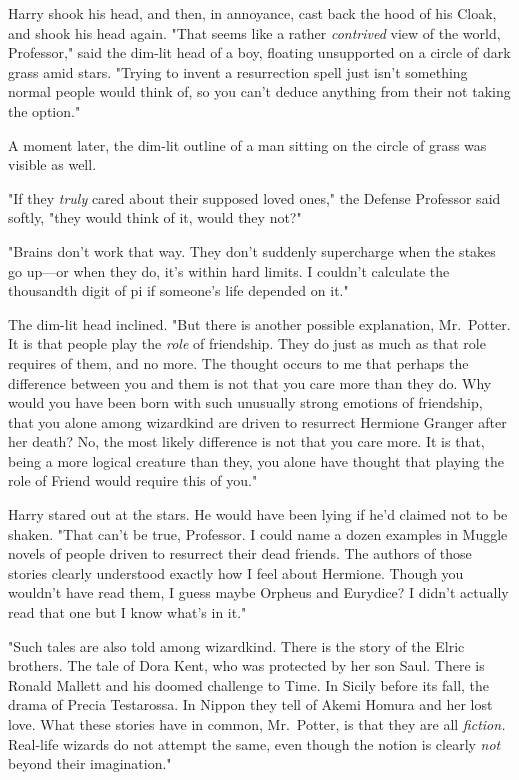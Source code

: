 Harry shook his head, and then, in annoyance, cast back the hood of his Cloak,
and shook his head again. "That seems like a rather \emph{contrived} view of
the world, Professor," said the dim-lit head of a boy, floating unsupported on
a circle of dark grass amid stars. "Trying to invent a resurrection spell just
isn't something normal people would think of, so you can't deduce anything from
their not taking the option."

A moment later, the dim-lit outline of a man sitting on the circle of grass was
visible as well.

"If they \emph{truly} cared about their supposed loved ones," the Defense
Professor said softly, "they would think of it, would they not?"

"Brains don't work that way. They don't suddenly supercharge when the stakes go
up---or when they do, it's within hard limits. I couldn't calculate the
thousandth digit of pi if someone's life depended on it."

The dim-lit head inclined. "But there is another possible explanation,
Mr.~Potter. It is that people play the \emph{role} of friendship. They do just
as much as that role requires of them, and no more. The thought occurs to me
that perhaps the difference between you and them is not that you care more than
they do. Why would you have been born with such unusually strong emotions of
friendship, that you alone among wizardkind are driven to resurrect Hermione
Granger after her death? No, the most likely difference is not that you care
more. It is that, being a more logical creature than they, you alone have
thought that playing the role of Friend would require this of you."

Harry stared out at the stars. He would have been lying if he'd claimed not to
be shaken. "That{\el} can't be true, Professor. I could name a dozen
examples in Muggle novels of people driven to resurrect their dead friends. The
authors of those stories clearly understood exactly how I feel about Hermione.
Though you wouldn't have read them, I guess{\el} maybe Orpheus and Eurydice?
I didn't actually read that one but I know what's in it."

"Such tales are also told among wizardkind. There is the story of the Elric
brothers. The tale of Dora Kent, who was protected by her son Saul. There is
Ronald Mallett and his doomed challenge to Time. In Sicily before its fall, the
drama of Precia Testarossa. In Nippon they tell of Akemi Homura and her lost
love. What these stories have in common, Mr.~Potter, is that they are all
\emph{fiction.} Real-life wizards do not attempt the same, even though the
notion is clearly \emph{not} beyond their imagination."

